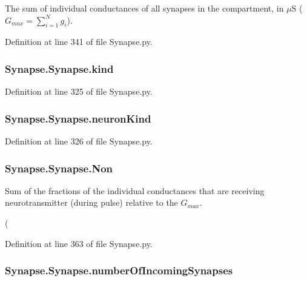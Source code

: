 The sum of individual conductances of all synapses in the compartment, in $\mu$S ( $G_{max} = \limits\sum_{i=1}^Ng_i$). 



Definition at line 341 of file Synapse.\-py.

\hypertarget{class_synapse_1_1_synapse_aa2ea45450a3ad13cfefcae9fabe6ce15}{
\subsubsection[{kind}]{\setlength{\rightskip}{0pt plus 5cm}Synapse.\-Synapse.\-kind}}\label{class_synapse_1_1_synapse_aa2ea45450a3ad13cfefcae9fabe6ce15}


Definition at line 325 of file Synapse.\-py.

\hypertarget{class_synapse_1_1_synapse_a031af2fe7be76f9b5f69c087228a1b9a}{
\subsubsection[{neuron\-Kind}]{\setlength{\rightskip}{0pt plus 5cm}Synapse.\-Synapse.\-neuron\-Kind}}\label{class_synapse_1_1_synapse_a031af2fe7be76f9b5f69c087228a1b9a}


Definition at line 326 of file Synapse.\-py.

\hypertarget{class_synapse_1_1_synapse_af8779bbc2ee2c5ae7747ee5cfbcf112e}{
\subsubsection[{Non}]{\setlength{\rightskip}{0pt plus 5cm}Synapse.\-Synapse.\-Non}}\label{class_synapse_1_1_synapse_af8779bbc2ee2c5ae7747ee5cfbcf112e}


Sum of the fractions of the individual conductances that are receiving neurotransmitter (during pulse) relative to the $G_{max}$. 

( 

Definition at line 363 of file Synapse.\-py.

\hypertarget{class_synapse_1_1_synapse_a6e55e008336cc47551669f3d77248d57}{
\subsubsection[{number\-Of\-Incoming\-Synapses}]{\setlength{\rightskip}{0pt plus 5cm}Synapse.\-Synapse.\-number\-Of\-Incoming\-Synapses}}\label{class_synapse_1_1_synapse_a6e55e008336cc47551669f3d77248d57}


